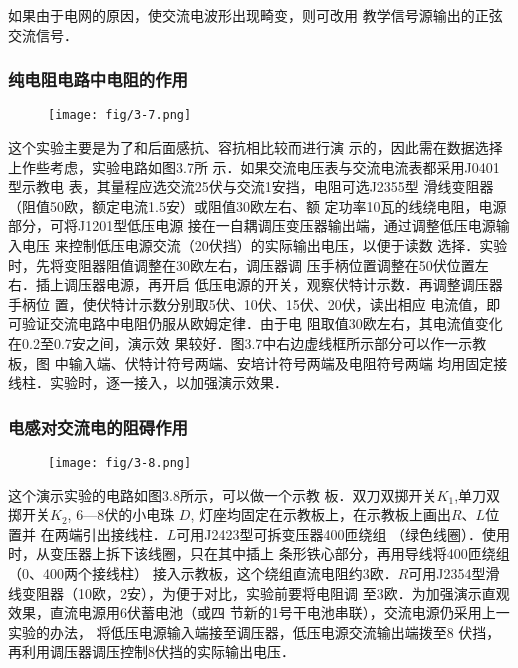 如果由于电网的原因，使交流电波形出现畸变，则可改用
教学信号源输出的正弦交流信号．

\subsubsection{纯电阻电路中电阻的作用}
\begin{figure}[htp]
    \centering
\texttt{[image: fig/3-7.png]}
    \caption{}
\end{figure}

这个实验主要是为了和后面感抗、容抗相比较而进行演
示的，因此需在数据选择上作些考虑，实验电路如图3.7所
示．如果交流电压表与交流电流表都采用J0401型示教电
表，其量程应选交流25伏与交流1安挡，电阻可选J2355型
滑线变阻器（阻值50欧，额定电流1.5安）或阻值30欧左右、额
定功率10瓦的线绕电阻，电源部分，可将J1201型低压电源
接在一自耦调压变压器输出端，通过调整低压电源输入电压
来控制低压电源交流（20伏挡）的实际输出电压，以便于读数
选择．实验时，先将变阻器阻值调整在30欧左右，调压器调
压手柄位置调整在50伏位置左右．插上调压器电源，再开启
低压电源的开关，观察伏特计示数．再调整调压器手柄位
置，使伏特计示数分别取5伏、10伏、15伏、20伏，读出相应
电流值，即可验证交流电路中电阻仍服从欧姆定律．由于电
阻取值30欧左右，其电流值变化在0.2至0.7安之间，演示效
果较好．图3.7中右边虚线框所示部分可以作一示教板，图
中输入端、伏特计符号两端、安培计符号两端及电阻符号两端
均用固定接线柱．实验时，逐一接入，以加强演示效果．


\subsubsection{电感对交流电的阻碍作用}

\begin{figure}[htp]
    \centering
\texttt{[image: fig/3-8.png]}
    \caption{}
\end{figure}

这个演示实验的电路如图3.8所示，可以做一个示教
板．双刀双掷开关$K_1$,单刀双掷开关$K_2$, 6—8伏的小电珠
$D$, 灯座均固定在示教板上，在示教板上画出$R$、$L$位置并
在两端引出接线柱．$L$可用J2423型可拆变压器400匝绕组
（绿色线圈）．使用时，从变压器上拆下该线圈，只在其中插上
条形铁心部分，再用导线将400匝绕组（0、400两个接线柱）
接入示教板，这个绕组直流电阻约3欧．$R$可用J2354型滑
线变阻器（10欧，2安），为便于对比，实验前要将电阻调
至3欧．为加强演示直观效果，直流电源用6伏蓄电池（或四
节新的1号干电池串联），交流电源仍采用上一实验的办法，
将低压电源输入端接至调压器，低压电源交流输出端拨至8
伏挡，再利用调压器调压控制8伏挡的实际输出电压．

